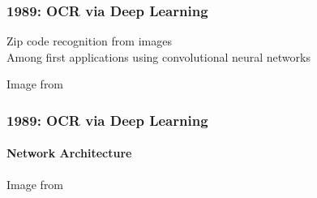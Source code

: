 \documentclass[xetex,professionalfont]{beamer}
\begin{document}

\begin{frame}
\frametitle{1989: OCR via Deep Learning}


Zip code recognition from images\\\medskip %
Among first applications using convolutional neural networks %

\bigskip
\begin{center}
	{\centering Image from \cite{lecun1989}}
\end{center}

\end{frame}


\begin{frame}
\frametitle{1989: OCR via Deep Learning}
\framesubtitle{Network Architecture}

\begin{center}
	{\centering Image from \cite{lecun1989}}
\end{center}

\end{frame}
\end{document}
